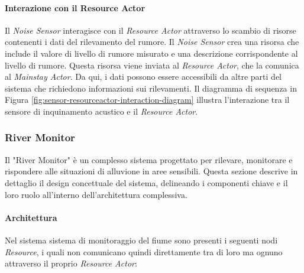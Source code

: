 \documentclass[12pt]{article}
\begin{document}
\paragraph{Interazione con il Resource Actor}
Il \textit{Noise Sensor} interagisce con il \textit{Resource Actor} attraverso lo scambio di risorse contenenti i dati del rilevamento del rumore. Il \textit{Noise Sensor} crea una risorsa che include il valore di livello di rumore misurato e una descrizione corrispondente al livello di rumore. Questa risorsa viene inviata al \textit{Resource Actor}, che la comunica al \textit{Mainstay Actor}. Da qui, i dati possono essere accessibili da altre parti del sistema che richiedono informazioni sui rilevamenti. Il diagramma di sequenza in Figura \ref{fig:sensor-resourceactor-interaction-diagram} illustra l'interazione tra il sensore di inquinamento acustico e il \textit{Resource Actor}.

\subsubsection{River Monitor}
Il "River Monitor" è un complesso sistema progettato per rilevare, monitorare e rispondere alle situazioni di alluvione in aree sensibili. Questa sezione descrive in dettaglio il design concettuale del sistema, delineando i componenti chiave e il loro ruolo all'interno dell'architettura complessiva.

\paragraph{Architettura}
Nel sistema sistema di monitoraggio del fiume sono presenti i seguenti nodi \textit{Resource}, i quali non comunicano quindi direttamente tra di loro ma ognuno attraverso il proprio \textit{Resource Actor}:
\end{document}
